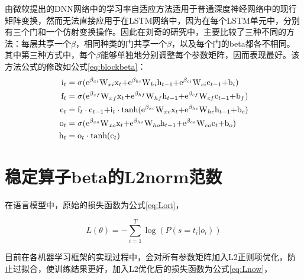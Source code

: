由微软提出的DNN网络中的学习率自适应方法适用于普通深度神经网络中的现行矩阵变换，然而无法直接应用于在LSTM网络中，因为在每个LSTM单元中，分别有三个门和一个仿射变换操作。因此在刘奇的研究中，主要比较了三种不同的方法：每层共享一个$\beta$，相同种类的门共享一个$\beta$，以及每个门的beta都各不相同。其中第三种方式中，每个$\beta$能够单独地分别调整每个参数矩阵，因而表现最好。该方法公式的修改如公式\ref{eq:blockbeta}：
\begin{equation}\label{eq:blockbeta}
\begin{split}
{{\rm{i}}_t}&  =  \sigma {\rm{ ( }}{{\rm{e}}^{{\beta _{xi}}}}{{\rm{W}}_{xi}}{{\rm{x}}_t}{\rm{ +  }}{{\rm{e}}^{{\beta _{hi}}}}{{\rm{W}}_{hi}}{{\rm{h}}_{t - 1}}{\rm{ +  }}{{\rm{e}}^{{\beta _{ci}}}}{{\rm{W}}_{ci}}{{\rm{c}}_{t - 1}}{\rm{ +  }}{{\rm{b}}_i}{\rm{)}}\\
{{\rm{f}}_t}&  =  \sigma {\rm{ ( }}{{\rm{e}}^{{\beta _{xf}}}}{{\rm{W}}_{xf}}{{\rm{x}}_t}{\rm{ +  }}{{\rm{e}}^{{\beta _{hf}}}}{{\rm{W}}_{hf}}{{\rm{h}}_{t - 1}}{\rm{ +  }}{{\rm{e}}^{{\beta _{cf}}}}{{\rm{W}}_{cf}}{\rm{ }}{{\rm{c}}_{t - 1}}{\rm{ +  }}{{\rm{b}}_f}{\rm{)}}\\
{{\rm{c}}_t} &=  {{\rm{f}}_t} \cdot {\rm{ }}{{\rm{c}}_{t - 1}}{\rm{ +  }}{{\rm{i}}_t} \cdot {\rm{ tanh ( }}{{\rm{e}}^{{\beta _{xc}}}}{{\rm{W}}_{xc}}{{\rm{x}}_t}{\rm{ +  }}{{\rm{e}}^{{\beta _{hc}}}}{{\rm{W}}_{hc}}{{\rm{h}}_{t - 1}}{\rm{ +  }}{{\rm{b}}_c}{\rm{)}}\\
{{\rm{o}}_t}&  =  \sigma {\rm{ ( }}{{\rm{e}}^{{\beta _{xo}}}}{{\rm{W}}_{xo}}{{\rm{x}}_t}{\rm{ +  }}{{\rm{e}}^{{\beta _{ho}}}}{{\rm{W}}_{ho}}{{\rm{h}}_{t - 1}}{\rm{ +  }}{{\rm{e}}^{{\beta _{co}}}}{{\rm{W}}_{co}}{{\rm{c}}_t}{\rm{ +  }}{{\rm{b}}_o}{\rm{)}}\\
{{\rm{h}}_t}&  =  {{\rm{o}}_t} \cdot {\rm{ tanh ( }}{{\rm{c}}_t}{\rm{)}}
\end{split}
\end{equation}



\section{稳定算子beta的L2norm范数} 
在语言模型中，原始的损失函数为公式\ref{eq:Lori}，

\begin{equation}
	\label{eq:Lori}
   	L\left( \theta  \right) =  - \sum\limits_{i = 1}^T {\log \left( {P\left( {s = {t_i}|{o_i}} \right)} \right)} 
\end{equation} 

目前在各机器学习框架的实现过程中，会对所有参数矩阵加入L2正则项优化，防止过拟合，使训练结果更好，加入L2优化后的损失函数为公式\ref{eq:Lnow}，

